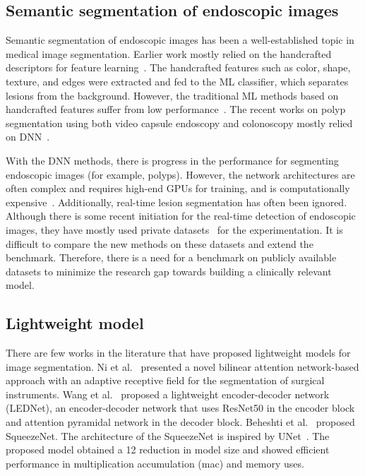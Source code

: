 \documentclass[journal]{IEEEtran}
\begin{document}
\subsection{Semantic segmentation of endoscopic images}
Semantic segmentation of endoscopic images has been a well-established topic in medical image segmentation. Earlier work mostly relied on the handcrafted descriptors for feature learning~\cite{karkanis2003computer,ameling2009texture}. The handcrafted features such as color, shape, texture, and edges were extracted and fed to the \ac{ML} classifier, which separates lesions from the background. However, the traditional \ac{ML} methods based on handcrafted features suffer from low performance~\cite{bernal2012towards}. The recent works on polyp segmentation using both video capsule endoscopy and colonoscopy mostly relied on \ac{DNN}~\cite{jia2019wireless,prasath2017polyp,tomar2021fanet,guo2020polyp,ali2021deep,fan2020pranet,jhacomprehensive}. 


With the \ac{DNN} methods, there is progress in the performance for segmenting endoscopic images (for example, polyps). However, the network architectures are often complex and requires high-end GPUs for training, and is computationally expensive~\cite{jha2019resunet++,jha2020doubleUNet,fan2020pranet}. Additionally, real-time lesion segmentation has often been ignored. Although there is some recent initiation for the real-time detection of endoscopic images, they have mostly used private datasets~\cite{lee2020real,yamada2019development,poon2020ai} for the experimentation. It is difficult to compare the new methods on these datasets and extend the benchmark. Therefore, there is a need for a benchmark on publicly available datasets to minimize the research gap towards building a clinically relevant model. 

\subsection{Lightweight model}
There are few works in the literature that have proposed lightweight models for image segmentation. Ni et al.~\cite{ni2020barnet} presented a novel bilinear attention network-based approach with an adaptive receptive field for the segmentation of surgical instruments. Wang et al.~\cite{wang2019lednet} proposed a lightweight encoder-decoder network (LEDNet), an encoder-decoder network that uses ResNet50 in the encoder block and attention pyramidal network in the decoder block. Beheshti et al.~\cite{beheshti2020squeeze} proposed SqueezeNet. The architecture of the SqueezeNet is inspired by UNet~\cite{romera2017erfnet}. The proposed model obtained a 12 reduction in model size and showed efficient performance in multiplication accumulation (mac) and memory uses. \\
\end{document}
